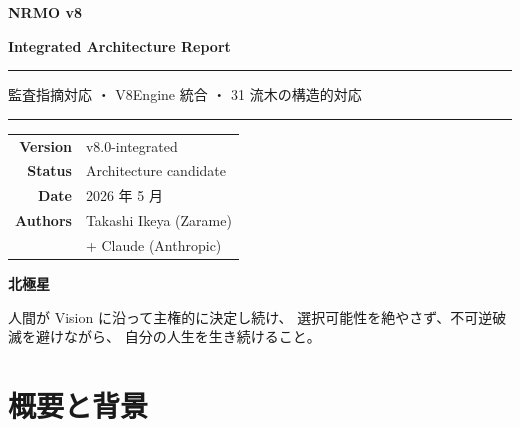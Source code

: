 \documentclass[a4paper,11pt]{report}
\begin{document}
\begin{titlepage}
  \centering
  \vspace*{2cm}
  
  {\Huge\bfseries\color{navy} NRMO v8\par}
  \vspace{0.5cm}
  {\Large\bfseries\color{navy} Integrated Architecture Report\par}
  \vspace{1.5cm}
  
  \rule{\linewidth}{0.5pt}
  \vspace{0.5cm}
  
  {\large 監査指摘対応 ・ V8Engine 統合 ・ 31 流木の構造的対応\par}
  
  \vspace{0.5cm}
  \rule{\linewidth}{0.5pt}
  \vspace{2cm}
  
  \begin{tabular}{rl}
    \textbf{Version} & v8.0-integrated \\
    \textbf{Status} & Architecture candidate \\
    \textbf{Date} & 2026 年 5 月 \\
    \textbf{Authors} & Takashi Ikeya (Zarame) \\
                     & + Claude (Anthropic) \\
  \end{tabular}
  
  \vfill
  
  \begin{tcolorbox}[colback=navy!5, colframe=navy, width=0.85\textwidth]
    \textbf{北極星}\par
    人間が Vision に沿って主権的に決定し続け、
    選択可能性を絶やさず、不可逆破滅を避けながら、
    自分の人生を生き続けること。
  \end{tcolorbox}
  
  \vspace{1cm}
\end{titlepage}

\tableofcontents
\newpage

\chapter{概要と背景}
\end{document}
